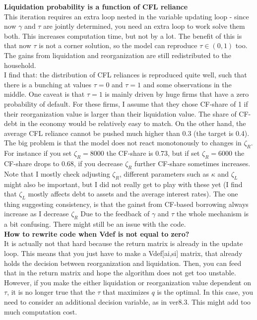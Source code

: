 \documentclass[12pt]{article}
\begin{document}
\textbf{Liquidation probability is a function of CFL reliance} \\
This iteration requires an extra loop nested in the variable updating loop - since now $\gamma$ and $\tau$ are jointly determined, you need an extra loop to work solve them both. This increases computation time, but not by a lot. The benefit of this is that now $\tau$ is not a corner solution, so the model can reproduce $\tau \in (0,1)$ too. The gains from liquidation and reorganization are still redistributed to the household. \vspace{3mm} \\
I find that: the distribution of CFL reliances is reproduced quite well, such that there is a bunching at values $\tau = 0$ and $\tau = 1$ and some observations in the middle. One caveat is that $\tau = 1$ is mainly driven by huge firms that have a zero probability of default. For these firms, I assume that they chose CF-share of 1 if their reorganization value is larger than their liquidation value. The share of CF-debt in the economy would be relatively easy to match. On the other hand, the average CFL reliance cannot be pushed much higher than 0.3 (the target is 0.4).   \vspace{3mm} \\
The big problem is that the model does not react monotonously to changes in $\zeta_R$. For instance if you set $\zeta_R = 8000$ the CF-share is 0.73, but if set $\zeta_R = 6000$ the CF-share drops to 0.68, if you decrease $\zeta_R$ further CF-share sometimes increases. Note that I mostly check adjusting $\zeta_R$, different parameters such as $\kappa$ and $\zeta_L$ might also be important, but I did not really get to play with these yet (I find that $\zeta_L$ mostly affects debt to assets and the average interest rates). The one thing suggesting consistency, is that the gainst from CF-based borrowing always increase as I decrease $\zeta_R$ Due to the feedback of $\gamma$ and $\tau$ the whole mechanism is a bit confusing. There might still be an issue with the code. \vspace{3mm} \\
\textbf{How to rewrite code when Vdef is not equal to zero?} \\
It is actually not that hard because the return matrix is already in the update loop. This means that you just have to make a Vdef[ai,si] matrix, that already holds the decision between reorganization and liquidation. Then, you can feed that in the return matrix and hope the algorithm does not get too unstable. However, if you make the either liquidation or reorganization value dependent on $\tau$, it is no longer true that the $\tau$ that maximizes $q$ is the optimal. In this case, you need to consider an additional decision variable, as in ver8.3. This might add too much computation cost.  \vspace{3mm} \\
\end{document}
